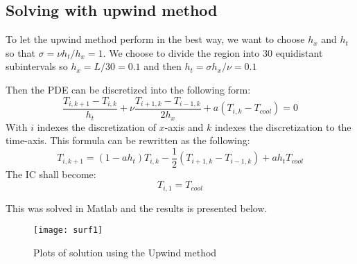 \documentclass[11pt,a4paper,roman]{scrartcl}
\begin{document}
\subsection*{Solving with upwind method}
To let the upwind method perform in the best way, we want to choose $h_x$ and $h_t$ so that $\sigma = \nu h_t/h_x=1$. We choose to divide the region into 30 equidistant subintervals so $h_x=L/30=0.1$ and then $h_t = \sigma h_x /\nu =0.1$

Then the PDE can be discretized into the following form: 
\begin{equation}
\frac{T_{i,k+1}-T_{i,k}}{h_t}+\nu\frac{T_{i+1,k}-T_{i-1,k}}{2h_x} + a(T_{i,k}-T_{cool}) = 0
\end{equation}
With $i$ indexes the discretization of $x$-axis and $k$ indexes the discretization to the time-axis. This formula can be rewritten as the following: 
\begin{equation}
T_{i,k+1} = (1-ah_t)T_{i,k}-\frac{1}{2}(T_{i+1,k}-T_{i-1,k})+ah_tT_{cool}
\end{equation}
The IC shall become: 
\begin{equation}
T_{i,1} = T_{cool} 
\end{equation}

This was solved in Matlab and the results is presented below.

\begin{figure}[h]
\centering
\texttt{[image: surf1]}
\caption{Plots of solution using the Upwind method}
\end{figure}

\newpage
\end{document}

